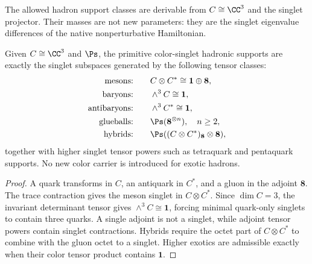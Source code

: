 \documentclass[12pt,a4paper]{article}
\begin{document}
The allowed hadron support classes are derivable from \(C\cong\CC^3\) and the singlet projector.  Their masses are not new parameters: they are the singlet eigenvalue differences of the native nonperturbative Hamiltonian.

\begin{theorem}
\label{p11:thm:singlet-support-classification}
Given \(C\cong\CC^3\) and \(\Ps\), the primitive color-singlet hadronic supports are exactly the singlet subspaces generated by the following tensor classes:
\begin{align}
\label{p11:eq:meson-support-class}
\text{mesons:}\qquad & C\otimes C^\ast\cong\mathbf1\oplus\mathbf8,\\
\label{p11:eq:baryon-support-class}
\text{baryons:}\qquad & \wedge^3C\cong\mathbf1,\\
\label{p11:eq:antibaryon-support-class}
\text{antibaryons:}\qquad & \wedge^3C^\ast\cong\mathbf1,\\
\label{p11:eq:glueball-support-class}
\text{glueballs:}\qquad & \Ps(\mathbf8^{\otimes n}),\quad n\ge2,\\
\label{p11:eq:hybrid-support-class}
\text{hybrids:}\qquad & \Ps((C\otimes C^\ast)_{\mathbf8}\otimes\mathbf8),
\end{align}
together with higher singlet tensor powers such as tetraquark and pentaquark supports.  No new color carrier is introduced for exotic hadrons.
\end{theorem}
\begin{proof}
A quark transforms in \(C\), an antiquark in \(C^\ast\), and a gluon in the adjoint \(\mathbf8\).  The trace contraction gives the meson singlet in \(C\otimes C^\ast\).  Since \(\dim C=3\), the invariant determinant tensor gives \(\wedge^3C\cong\mathbf1\), forcing minimal quark-only singlets to contain three quarks.  A single adjoint is not a singlet, while adjoint tensor powers contain singlet contractions.  Hybrids require the octet part of \(C\otimes C^\ast\) to combine with the gluon octet to a singlet.  Higher exotics are admissible exactly when their color tensor product contains \(\mathbf1\).\qedhere
\end{proof}
\end{document}
